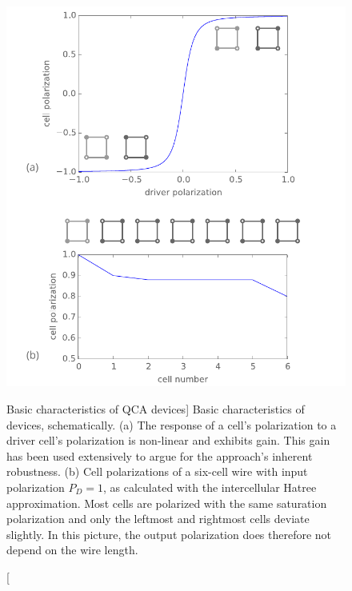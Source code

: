 \begin{figure}
  \center
  \includegraphics{qca_characterization}
  \caption
[Basic characteristics of QCA devices]
{
Basic characteristics of  devices, schematically. (a) The response of a
cell's polarization to a driver cell's polarization is non-linear and exhibits
gain. This gain has been used extensively to argue for the  approach's
inherent robustness. (b) Cell polarizations of a six-cell wire with input
polarization $P_D = 1$, as calculated with the intercellular Hatree
approximation. Most cells are polarized with the same saturation polarization
and only the leftmost and rightmost cells deviate slightly. In this picture, the
output polarization does therefore not depend on the wire length.
}
  \label{fig:qca_characterization}
\end{figure}

